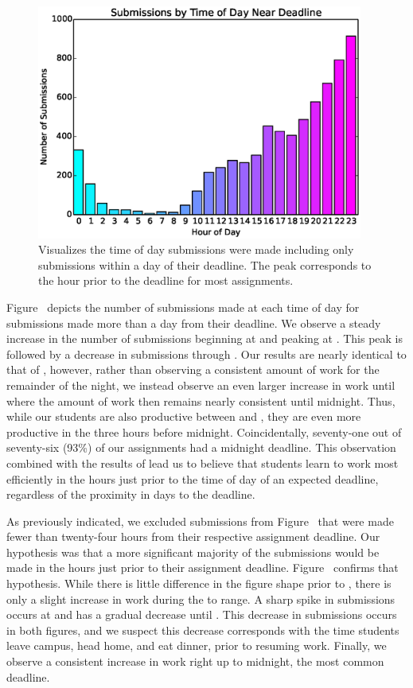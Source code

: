 \begin{figure}[!t]
\centering
\includegraphics[trim=0 .12in 0 .10in, clip, width=4.215in]{graphs/Submissions_by_Time_of_Day_Near_Deadline.eps}
\caption{Visualizes the time of day submissions were made including only
  submissions within a day of their deadline. The  peak corresponds to
  the hour prior to the deadline for most assignments.}
\end{figure}

Figure~ depicts the number of submissions made at
each time of day for submissions made more than a day from their deadline. We
observe a steady increase in the number of submissions beginning at  and
peaking at . This peak is followed by a decrease in submissions through
. Our results are nearly identical to that of \spacco{}, however, rather
than observing a consistent amount of work for the remainder of the night, we
instead observe an even larger increase in work until  where the amount
of work then remains nearly consistent until midnight. Thus, while our students
are also productive between  and , they are even more productive in
the three hours before midnight. Coincidentally, seventy-one out of seventy-six
(93\%) of our assignments had a midnight deadline. This observation combined
with the results of \spacco{} lead us to believe that students learn to work
most efficiently in the hours just prior to the time of day of an expected
deadline, regardless of the proximity in days to the deadline.

As previously indicated, we excluded submissions from
Figure~ that were made fewer than twenty-four hours
from their respective assignment deadline. Our hypothesis was that a more
significant majority of the submissions would be made in the hours just prior
to their assignment deadline. Figure~ confirms that
hypothesis. While there is little difference in the figure shape prior to
, there is only a slight increase in work during the  to 
range. A sharp spike in submissions occurs at  and has a gradual decrease
until . This decrease in submissions occurs in both figures, and we
suspect this decrease corresponds with the time students leave campus, head
home, and eat dinner, prior to resuming work. Finally, we observe a consistent
increase in work right up to midnight, the most common deadline.

